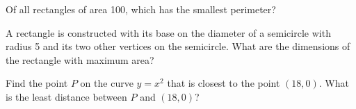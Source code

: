 \documentclass[10pt,t,handout,ignorenonframetext,aspectratio=169]{beamer}
\begin{document}
\begin{frame}
  \vs
  \begin{example}
    Of all rectangles of area 100, which has the smallest perimeter?
  \end{example}
\end{frame}


\begin{frame}
  \vs
  \begin{example}
    A rectangle is constructed with its base on the diameter of a
    semicircle with radius 5 and its two other vertices on the
    semicircle. What are the dimensions of the rectangle with maximum
    area?
  \end{example}
\end{frame}

\begin{frame}
  \vs
  \begin{example}
    Find the point $P$ on the curve $y = x^2$ that is closest to the
    point $(18,0)$. What is the least distance between $P$ and $(18,0)$?
  \end{example}
\end{frame}



\end{document}
